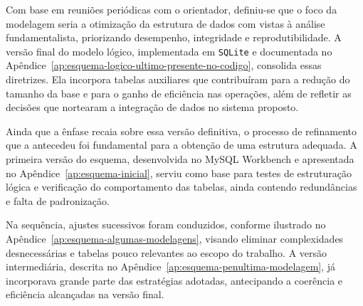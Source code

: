 %
%


Com base em reuniões periódicas com o orientador, definiu-se que o foco da modelagem seria a otimização da estrutura de dados com vistas à análise fundamentalista, priorizando desempenho, integridade e reprodutibilidade. A versão final do modelo lógico, implementada em \texttt{SQLite} e documentada no Apêndice~\ref{ap:esquema-logico-ultimo-presente-no-codigo}, consolida essas diretrizes. Ela incorpora tabelas auxiliares que contribuíram para a redução do tamanho da base e para o ganho de eficiência nas operações, além de refletir as decisões que nortearam a integração de dados no sistema proposto.

Ainda que a ênfase recaia sobre essa versão definitiva, o processo de refinamento que a antecedeu foi fundamental para a obtenção de uma estrutura adequada. A primeira versão do esquema, desenvolvida no MySQL Workbench e apresentada no Apêndice~\ref{ap:esquema-inicial}, serviu como base para testes de estruturação lógica e verificação do comportamento das tabelas, ainda contendo redundâncias e falta de padronização.

Na sequência, ajustes sucessivos foram conduzidos, conforme ilustrado no Apêndice~\ref{ap:esquema-algumas-modelagens}, visando eliminar complexidades desnecessárias e tabelas pouco relevantes ao escopo do trabalho. A versão intermediária, descrita no Apêndice~\ref{ap:esquema-penultima-modelagem}, já incorporava grande parte das estratégias adotadas, antecipando a coerência e eficiência alcançadas na versão final.


